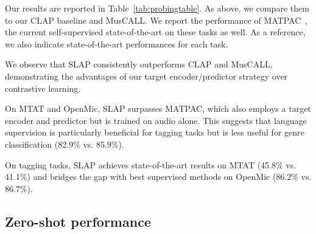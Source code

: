 \documentclass{article}
\begin{document}
Our results are reported in Table~\ref{tab:probingtable}. As above, we compare them to our CLAP baseline and MusCALL. We report the performance of  MATPAC~\cite{MATPAC}, the current self-supervised state-of-the-art on these tasks as well.
As a reference, we also indicate state-of-the-art performances for each task.


We observe that SLAP consistently outperforms CLAP and MusCALL, demonstrating the advantages of our target encoder/predictor strategy over contrastive learning.

On MTAT and OpenMic, SLAP surpasses MATPAC, which also employs a target encoder and predictor but is trained on audio alone. This suggests that language supervision is particularly beneficial for tagging tasks but is less useful for genre classification (82.9\% vs. 85.9\%).

On tagging tasks, SLAP achieves state-of-the-art results on MTAT (45.8\% vs. 41.1\%) and bridges the gap with best supervised methods on OpenMic (86.2\% vs. 86.7\%).



\subsection{Zero-shot performance} \label{subsection: Zero-shot performance}
\end{document}
